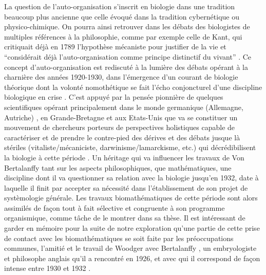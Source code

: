 La question de l'auto-organisation s'inscrit en biologie dans une tradition beaucoup plus ancienne que celle évoqué dans la tradition cybernétique ou physico-chimique. On pourra ainsi retrouver dans les débats des biologistes de multiples références à la philosophie, comme par exemple celle de Kant, qui critiquait déjà en 1789 l'hypothèse mécaniste pour justifier de la vie et \enquote{considérait déjà l'auto-organisation comme principe distinctif du vivant} \autocites[76]{Pouvreau2013}[275]{Mossio2010}[6]{Mossio2014}. Ce concept d'auto-organisation \autocite[68]{Stengers1985} est rediscuté à la lumière des débats opérant à la charnière des années 1920-1930, dans l'émergence d'un courant de biologie théorique dont la volonté nomothétique se fait l'écho conjoncturel d'une discipline biologique en crise \autocites[421-434]{Pouvreau2013}. C'est appuyé par la pensée pionnière de quelques scientifiques opérant principalement dans le monde germanique (Allemagne, Autriche) \autocite{Drack2007b}, en Grande-Bretagne et aux Etats-Unis que va se constituer un mouvement de chercheurs porteurs de perspectives holistiques capable de caractériser et de prendre le contre-pied des dérives et des débats jusque là stériles (vitaliste/mécaniciste, darwinisme/lamarckisme, etc.) qui décrédibilisent la biologie à cette période \autocite[153-154]{Pouvreau2013}. Un héritage qui va influencer les travaux de Von Bertalanffy tant sur les aspects philosophiques, que mathématiques, une discipline dont il va questionner sa relation avec la biologie \autocite{Pouvreau2005} jusqu'en 1932, date à laquelle il finit par accepter sa nécessité dans l'établissement de son projet de systèmologie générale. Les travaux biomathématiques de cette période sont alors assimilés de façon tout à fait sélective et congruente à son programme organismique, comme tâche de le montrer \textcite[515]{Pouvreau2013} dans sa thèse. Il est intéressant de garder en mémoire pour la suite de notre exploration qu'une partie de cette prise de contact avec les biomathématiques se soit faite par les préoccupations communes, l'amitié et le travail de Woodger avec Bertalanffy \autocite[347,433]{Pouvreau2013}, un embryologiste et philosophe anglais qu'il a rencontré en 1926, et avec qui il correspond de façon intense entre 1930 et 1932 \autocite[165]{Pouvreau2013}.

